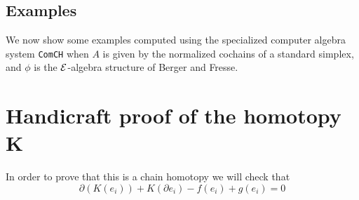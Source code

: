 \subsection{Examples}

We now show some examples computed using the specialized computer algebra system \texttt{ComCH} \cite{medina2021comch} when $A$ is given by the normalized cochains of a standard simplex, and $\phi$ is the $\mathcal{E}$-algebra structure of Berger and Fresse.

\appendix
\section{Handicraft proof of the homotopy K}

In order to prove that this is a chain homotopy we will check that 
\[\partial(K(e_{i})) + K(\partial e_{i})-f(e_{i}) + g(e_{i}) = 0\]
